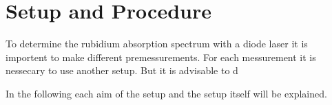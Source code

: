 \section{Setup and Procedure}
To determine the rubidium absorption spectrum with a diode laser it is importent to make different premessurements.
For each messurement it is nessecary to use another setup. But it is advisable to d

\noindent
In the following each aim of the setup and the setup itself will be explained.

\subsection{}